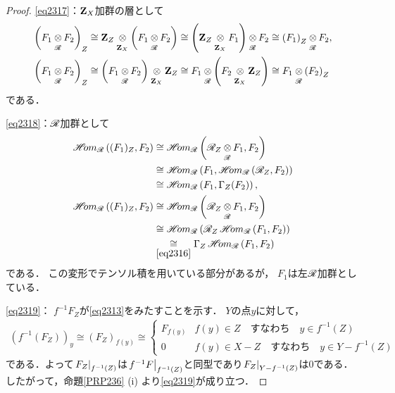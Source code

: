 \begin{proof}
    \eqref{eq2317}：\(\zz_X\)加群の層として
    \begin{align*}
        \left(F_{1}\ttens[\scR]F_{2}\right)_{Z}
        &\cong
        \zz_{Z}\ttens[\zz_X]\left(F_{1}\ttens[\scR]F_{2}\right)
        \cong
        \left(\zz_{Z}\ttens[\zz_X]F_{1}\right)\ttens[\scR]F_{2}
        \cong
        \left(F_{1}\right)_{Z}\ttens[\scR]F_{2},\\
        \left(F_{1}\ttens[\scR]F_{2}\right)_{Z}
        &\cong
        \left(F_{1}\ttens[\scR]F_{2}\right)\ttens[\zz_X]\zz_{Z}
        \cong
        F_{1}\ttens[\scR]\left(F_{2}\ttens[\zz_X]\zz_{Z}\right)
        \cong
        F_{1}\ttens[\scR]\left(F_{2}\right)_{Z}
    \end{align*}
    である．

    \eqref{eq2318}：\(\scR\)加群として
    \begin{align*}
        \HOM_{\scR}\left((F_1)_{Z},F_2\right)
        &\cong
        \HOM_{\scR}\left(\scR_{Z}\ttens[\scR]F_1,F_2\right)\\
        &\cong
        \HOM_{\scR}\left(F_1,\HOM_{\scR}\left(\scR_{Z},F_2\right)\right)\\
        &\cong
        \HOM_{\scR}\left(F_{1},\Gamma_{Z}(F_{2})\right),\\
        \HOM_{\scR}\left((F_1)_{Z},F_2\right)
        &\cong
        \HOM_{\scR}\left(\scR_{Z}\ttens[\scR]F_1,F_2\right)\\
        &\cong
        \HOM_{\scR}\left(\scR_{Z}\HOM_{\scR}\left(F_1,F_2\right)\right)\\
        &\underset{\eqref{eq2316}}{\cong}
        \Gamma_{Z}\HOM_{\scR}\left(F_1,F_2\right)
    \end{align*}
    である．
    この変形でテンソル積を用いている部分があるが，
    \(F_1\)は左\(\scR\)加群としている．

    \eqref{eq2319}：
    \(f^{-1}F_Z\)が\eqref{eq2313}をみたすことを示す．
    \(Y\)の点\(y\)に対して，\begin{align*}
        \left(f^{-1}(F_Z)\right)_{y}
        \cong (F_Z)_{f(y)}
        \cong \begin{cases}
            F_{f(y)}& f(y)\in Z\quad\text{すなわち}\quad y\in f^{-1}(Z)\\
            0& f(y)\in X-Z\quad\text{すなわち}\quad  y\in Y-f^{-1}(Z)
        \end{cases}
    \end{align*}
    である．よって\(\mres[F_Z]{f^{-1}(Z)}\)は\(
        \mres[f^{-1}F]{f^{-1}(Z)}
    \)と同型であり\(\mres[F_Z]{Y-f^{-1}(Z)}\)は\(0\)である．
    したがって，命題\ref{PRP236} (i) より\eqref{eq2319}が成り立つ．


\end{proof}
